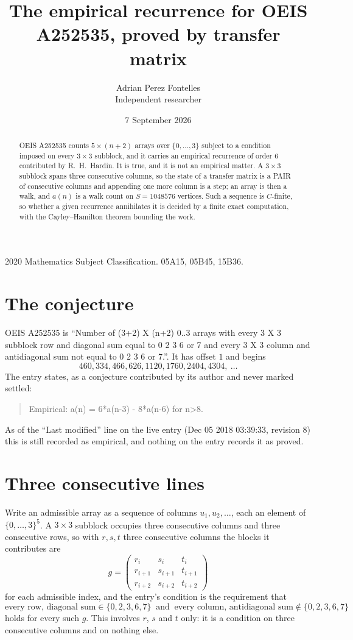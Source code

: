 \documentclass[11pt,a4paper]{article}
\title{The empirical recurrence for OEIS A252535, proved by transfer matrix}
\author{Adrian Perez Fontelles\\ \small Independent researcher}
\date{7 September 2026}
\theoremstyle{plain}
\theoremstyle{definition}
\begin{document}
\maketitle

\begin{abstract}
OEIS A252535 counts $5\times(n+2)$ arrays over $\{0,\dots,3\}$ subject to a condition imposed on
every $3\times3$ subblock, and it carries an empirical recurrence of order $6$
contributed by R.~H.~Hardin. It is true, and it is not an empirical matter. A $3\times3$
subblock spans three consecutive columns, so the state of a transfer matrix is a PAIR of
consecutive columns and appending one more column is a step; an array is then a walk, and
$a(n)$ is a walk count on $S=1048576$ vertices. Such a sequence is $C$-finite, so whether a given
recurrence annihilates it is decided by a finite exact computation, with the Cayley--Hamilton
theorem bounding the work.
\end{abstract}

\noindent\small 2020 Mathematics Subject Classification. 05A15, 05B45, 15B36.\normalsize

\section{The conjecture}

OEIS A252535 is ``Number of (3+2) X (n+2) 0..3 arrays with every 3 X 3 subblock row and diagonal sum equal to 0 2 3 6 or 7 and every 3 X 3 column and antidiagonal sum not equal to 0 2 3 6 or 7.''. It has offset $1$ and begins
\[
460, 334, 466, 626, 1120, 1760, 2404, 4304,\ \dots
\]
The entry states, as a conjecture contributed by its author and never marked settled:
\begin{quote}
Empirical: a(n) = 6*a(n-3) - 8*a(n-6) for n>8.
\end{quote}
As of the ``Last modified'' line on the live entry (Dec 05 2018 03:39:33, revision 8) this is still
recorded as empirical, and nothing on the entry records it as proved.

\section{Three consecutive lines}

Write an admissible array as a sequence of columns $u_1,u_2,\dots$, each an element of
$\{0,\dots,3\}^{5}$. A $3\times3$ subblock occupies three consecutive columns and
three consecutive rows, so with $r,s,t$ three consecutive columns the blocks it
contributes are
\[
g=\begin{pmatrix}r_i&s_i&t_i\\ r_{i+1}&s_{i+1}&t_{i+1}\\ r_{i+2}&s_{i+2}&t_{i+2}\end{pmatrix}
\]
for each admissible index, and the entry's condition is the requirement that
\[
\text{every row, diagonal sum} \in \{0,2,3,6,7\}\ \text{ and }\ \text{every column, antidiagonal sum} \notin \{0,2,3,6,7\}
\]
holds for every such $g$. This involves $r$, $s$ and $t$ only: it is a condition on
three consecutive columns and on nothing else.
\end{document}
